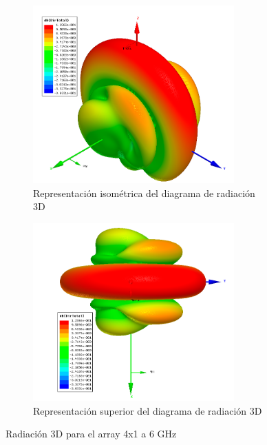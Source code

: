 \begin{figure}[H]
     \centering
     \begin{subfigure}[b]{0.7\textwidth}
         \centering
         \includegraphics[width=0.85\textwidth]{archivos/analisis/4x12/6}
         \caption{Representación isométrica del diagrama de radiación 3D}
         \label{fig:3d14x12}
     \end{subfigure}
     \hfill
     \begin{subfigure}[b]{0.7\textwidth}
         \centering
         \includegraphics[width=0.85\textwidth]{archivos/analisis/4x12/7}
         \caption{Representación superior del diagrama de radiación 3D}
         \label{fig:3d24x12}
     \end{subfigure}
     \hfill
        \caption{Radiación 3D para el array 4x1 a 6 GHz}
        \label{fig:3d4x12}
\end{figure}

